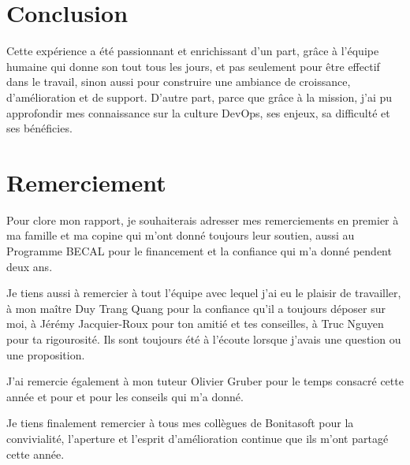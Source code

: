 \section{Conclusion}
Cette expérience a été passionnant et enrichissant d'un part, grâce à l'équipe humaine qui donne son tout tous les jours, et pas seulement pour être effectif dans le travail, sinon aussi pour construire une ambiance de croissance, d'amélioration et de support.
D'autre part, parce que grâce à la mission, j'ai pu approfondir mes connaissance sur la culture DevOps, ses enjeux, sa difficulté et ses bénéficies.

\section{Remerciement}
Pour clore mon rapport, je souhaiterais adresser mes remerciements en premier à ma famille et ma copine qui m'ont donné toujours leur soutien, aussi au Programme BECAL pour le financement et la confiance qui m'a donné pendent deux ans.

Je tiens aussi à remercier à tout l'équipe avec lequel j'ai eu le plaisir de travailler, à mon maître Duy Trang Quang pour la confiance qu'il a toujours déposer sur moi, à Jérémy Jacquier-Roux pour ton amitié et tes conseilles, à Truc Nguyen pour ta rigourosité. Ils sont toujours été à l'écoute lorsque j'avais une question ou une proposition.

J'ai remercie également à mon tuteur Olivier Gruber pour le temps consacré cette année et pour et pour les conseils qui m'a donné.

Je tiens finalement remercier à tous mes collègues de Bonitasoft pour la convivialité, l'aperture et l'esprit d'amélioration continue que ils m'ont partagé cette année.

